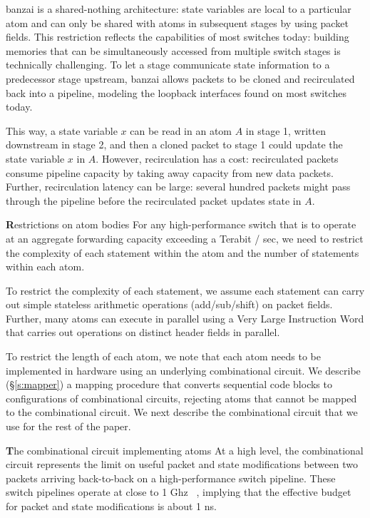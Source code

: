 banzai is a shared-nothing architecture: state variables are local to a
particular atom and can only be shared with atoms in subsequent stages by using
packet fields.  This restriction reflects the capabilities of most switches
today: building memories that can be simultaneously accessed from multiple
switch stages is technically challenging.  To let a stage communicate state
information to a predecessor stage upstream, banzai allows packets to be cloned
and recirculated back into a pipeline, modeling the loopback interfaces found
on most switches today.

This way, a state variable $x$ can be read in an atom $A$ in stage 1, written
downstream in stage 2, and then a cloned packet to stage 1 could update the
state variable $x$ in $A$.  However, recirculation has a cost: recirculated
packets consume pipeline capacity by taking away capacity from new data
packets. Further, recirculation latency can be large: several hundred packets
might pass through the pipeline before the recirculated packet updates state in
$A$.

{\textbf Restrictions on atom bodies}
For any high-performance switch that is to operate at an aggregate forwarding
capacity exceeding a Terabit / sec, we need to restrict the complexity of each
statement within the atom and the number of statements within each atom.

To restrict the complexity of each statement, we assume each statement can
carry out simple stateless arithmetic operations (add/sub/shift) on packet
fields. Further, many atoms can execute in parallel using a Very Large
Instruction Word that carries out operations on distinct header fields in
parallel.

To restrict the length of each atom, we note that each atom needs to be
implemented in hardware using an underlying combinational circuit. We describe
(\S\ref{s:mapper}) a mapping procedure that converts sequential code blocks to
configurations of combinational circuits, rejecting atoms that cannot be mapped
to the combinational circuit. We next describe the combinational circuit that
we use for the rest of the paper.

{\textbf The combinational circuit implementing atoms}
At a high level, the combinational circuit represents the limit on useful
packet and state modifications between two packets arriving back-to-back on a
high-performance switch pipeline. These switch pipelines operate at close to 1
Ghz ~\cite{rmt}, implying that the effective budget for packet and state
modifications is about 1 ns.

